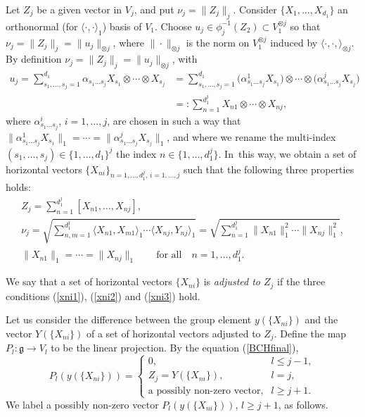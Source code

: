 \documentclass[10pt,a4paper]{amsart}
\numberwithin{equation}{section}
\newcommand{\g}{\mathfrak{g}}
\begin{document}
Let $Z_j$ be a given vector in $V_j$,
and put $\nu_j=\|Z_j\|_j$.
 Consider $\{X_1,\dots,X_{d_1}\}$ an orthonormal (for $\langle\cdot,\cdot\rangle_1$) basis of $V_1$.
 Choose $u_j\in \phi_j^{-1}(Z_2)\subset V_1^{\otimes j}$ so that $\nu_j=\|Z_j\|_j=\|u_j\|_{\otimes j}$,
 where $\|\cdot\|_{\otimes j}$ is the norm on $V_1^{\otimes j}$ induced by $\langle\cdot,\cdot,\rangle_{\otimes j}$.
 By definition $\nu_j=\|Z_j\|_j=\|u_j\|_{\otimes j}$,
 with
 \begin{align*}
 u_j=\sum_{s_1,\dots,s_j=1}^{d_1}\alpha_{s_1\dots s_j}X_{s_1}\otimes\cdots\otimes X_{s_j}
 &=\sum_{s_1,\dots,s_j=1}^{d_1}\big(\alpha_{s_1\dots s_j}^1X_{s_1}\big)\otimes\cdots\otimes \big(\alpha_{s_1\dots s_j}^j X_{s_j}\big)
 \\
 &=:\sum_{n=1}^{d_1^j}X_{n1}\otimes \cdots\otimes X_{nj},
 \end{align*}
 where $\alpha_{s_1\dots s_j}^i$, $i=1,\dots,j$, are chosen in such a way that $\big\|\alpha_{s_1\dots s_j}^1X_{s_1}\big\|_1=\cdots =\big\|\alpha_{s_1\dots s_j}^jX_{s_j}\big\|_1$,
 and where we rename the multi-index $(s_1,\dots,s_j)\in\{1,\dots,d_1\}^j$ the index $n\in\big\{1,\dots,d_1^j\big\}$.
 In~this way,
we obtain a set of horizontal vectors $\{X_{ni}\}_{n=1,\dots,d_1^j,\,i=1,\dots,j}$ such that the following three properties holds:
 \begin{gather}
Z_j=\sum_{n=1}^{d_1^j}[X_{n1},\dots,X_{nj}],\label{xni1}
 \\
\nu_j=\sqrt{\sum_{n,m=1}^{d_1^j}\langle X_{n1},X_{m1}\rangle_1\cdots\langle X_{nj},Y_{nj}\rangle_1}=\sqrt{\sum_{n=1}^{d_1^j}\|X_{n1}\|_1^2\cdots\|X_{nj}\|_1^2},\label{xni2}
 \\
\|X_{n1}\|_1=\cdots=\|X_{nj}\|_1\qquad \text{for all}\quad n=1,\dots,d_1^j.\label{xni3}
\end{gather}

\begin{Definition}
 We say that a set of horizontal vectors $\{X_{ni}\}$ is \textit{adjusted to $Z_j$} if the three conditions (\ref{xni1}),
 (\ref{xni2}) and (\ref{xni3}) hold.
\end{Definition}

Let us consider the difference between the group element $y(\{X_{ni}\})$ and the vector $Y(\{X_{ni}\})$ of a set of horizontal vectors adjusted to $Z_j$.
Define the map $P_l\colon \g\to V_l$ to be the linear projection.
By the equation (\ref{BCHfinal}),
\[
 P_l(y(\{X_{ni}\}))=\begin{cases}
 0, & l\leq j-1,\\
Z_j=Y(\{X_{ni}\}), & l=j,\\
\text{a possibly non-zero vector}, & l\geq j+1.
\end{cases}
\]
We label a possibly non-zero vector $P_l(y(\{X_{ni}\}))$, $l\geq j+1$, as follows.
\end{document}
